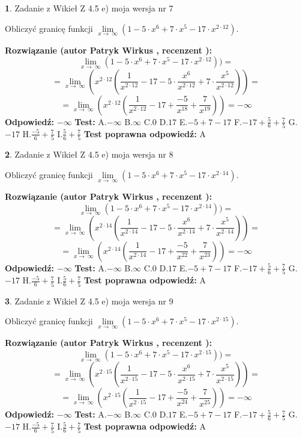 \documentclass[12pt, a4paper]{article}
\theoremstyle{definition} %
\newtheorem{zad}{}
\newcommand{\zadStart}[1]{\begin{zad}#1\newline}
\newcommand{\zadStop}{\end{zad}}
\newcommand{\rozwStart}[2]{\noindent \textbf{Rozwiązanie (autor #1 , recenzent #2): }\newline}
\newcommand{\rozwStop}{\newline}
\newcommand{\odpStart}{\noindent \textbf{Odpowiedź:}\newline}
\newcommand{\odpStop}{\newline}
\newcommand{\testStart}{\noindent \textbf{Test:}\newline}
\newcommand{\testStop}{\newline}
\newcommand{\kluczStart}{\noindent \textbf{Test poprawna odpowiedź:}\newline}
\newcommand{\kluczStop}{\newline}
\begin{document}
\zadStart{Zadanie z Wikieł Z 4.5 e) moja wersja nr 7}



Obliczyć granicę funkcji  $\lim\limits_{x\to\ \infty}(1 - 5 \cdot x^{6}+7 \cdot x^{5}- 17 \cdot x^{2\cdot12})$.
\zadStop
\rozwStart{Patryk Wirkus}{}
$$\lim\limits_{x\to\ \infty}(1 - 5 \cdot x^{6}+7 \cdot x^{5}- 17 \cdot x^{2\cdot12}))=$$
$$=\lim\limits_{x\to\ \infty}(x^{2\cdot12}(\frac{1}{x^{2\cdot12}}-17 -5 \cdot \frac{x^{6}}{x^{2\cdot12}}+7 \cdot \frac{x^{5}}{x^{2\cdot12}}))=$$
$$=\lim\limits_{x\to\ \infty}(x^{2\cdot12}(\frac{1}{x^{2\cdot12}}-17 + \frac{-5}{x^{18}}+ \frac{7}{x^{19}}))=-\infty$$
\rozwStop
\odpStart
$-\infty$
\odpStop
\testStart
A.$-\infty$ B.$\infty$ C.$0$ D.$17$ E.$-5 + 7 - 17$
F.$-17+\frac{5}{6}+\frac{7}{5}$ G.$-17$
H.$\frac{-5}{6}+\frac{7}{5}$
I.$\frac{5}{6}+\frac{7}{5}$
\testStop
\kluczStart
A
\kluczStop



\zadStart{Zadanie z Wikieł Z 4.5 e) moja wersja nr 8}



Obliczyć granicę funkcji  $\lim\limits_{x\to\ \infty}(1 - 5 \cdot x^{6}+7 \cdot x^{5}- 17 \cdot x^{2\cdot14})$.
\zadStop
\rozwStart{Patryk Wirkus}{}
$$\lim\limits_{x\to\ \infty}(1 - 5 \cdot x^{6}+7 \cdot x^{5}- 17 \cdot x^{2\cdot14}))=$$
$$=\lim\limits_{x\to\ \infty}(x^{2\cdot14}(\frac{1}{x^{2\cdot14}}-17 -5 \cdot \frac{x^{6}}{x^{2\cdot14}}+7 \cdot \frac{x^{5}}{x^{2\cdot14}}))=$$
$$=\lim\limits_{x\to\ \infty}(x^{2\cdot14}(\frac{1}{x^{2\cdot14}}-17 + \frac{-5}{x^{22}}+ \frac{7}{x^{23}}))=-\infty$$
\rozwStop
\odpStart
$-\infty$
\odpStop
\testStart
A.$-\infty$ B.$\infty$ C.$0$ D.$17$ E.$-5 + 7 - 17$
F.$-17+\frac{5}{6}+\frac{7}{5}$ G.$-17$
H.$\frac{-5}{6}+\frac{7}{5}$
I.$\frac{5}{6}+\frac{7}{5}$
\testStop
\kluczStart
A
\kluczStop



\zadStart{Zadanie z Wikieł Z 4.5 e) moja wersja nr 9}



Obliczyć granicę funkcji  $\lim\limits_{x\to\ \infty}(1 - 5 \cdot x^{6}+7 \cdot x^{5}- 17 \cdot x^{2\cdot15})$.
\zadStop
\rozwStart{Patryk Wirkus}{}
$$\lim\limits_{x\to\ \infty}(1 - 5 \cdot x^{6}+7 \cdot x^{5}- 17 \cdot x^{2\cdot15}))=$$
$$=\lim\limits_{x\to\ \infty}(x^{2\cdot15}(\frac{1}{x^{2\cdot15}}-17 -5 \cdot \frac{x^{6}}{x^{2\cdot15}}+7 \cdot \frac{x^{5}}{x^{2\cdot15}}))=$$
$$=\lim\limits_{x\to\ \infty}(x^{2\cdot15}(\frac{1}{x^{2\cdot15}}-17 + \frac{-5}{x^{24}}+ \frac{7}{x^{25}}))=-\infty$$
\rozwStop
\odpStart
$-\infty$
\odpStop
\testStart
A.$-\infty$ B.$\infty$ C.$0$ D.$17$ E.$-5 + 7 - 17$
F.$-17+\frac{5}{6}+\frac{7}{5}$ G.$-17$
H.$\frac{-5}{6}+\frac{7}{5}$
I.$\frac{5}{6}+\frac{7}{5}$
\testStop
\kluczStart
A
\kluczStop
\end{document}
